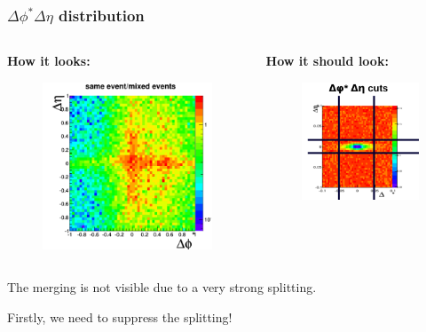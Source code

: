 \documentclass[dvipsnames] {beamer}
\begin{document}
\begin{frame}[shrink=50]
  \frametitle{$\Delta \phi^{*} \Delta \eta$ distribution}
  \begin{columns}
    \begin{block}{\bf \centering How it looks:}
      \begin{figure}[H]
        \includegraphics[width=.75\linewidth]{test_DEltaEta_DEltaphi.png}
      \end{figure}
    \end{block}
    \begin{block}{\bf \centering How it should look:}
      \begin{figure}[H]
        \includegraphics[width=.75\linewidth]{deltaEtadeltaPhi_howto.png}
      \end{figure}
    \end{block}
  \end{columns}
  \begin{block}{}
    \bf \centering
    {\LARGE
    The merging is not visible due to a very strong splitting.
    
    Firstly, we need to suppress the splitting!

    }
  \end{block}
\end{frame}
\end{document}
